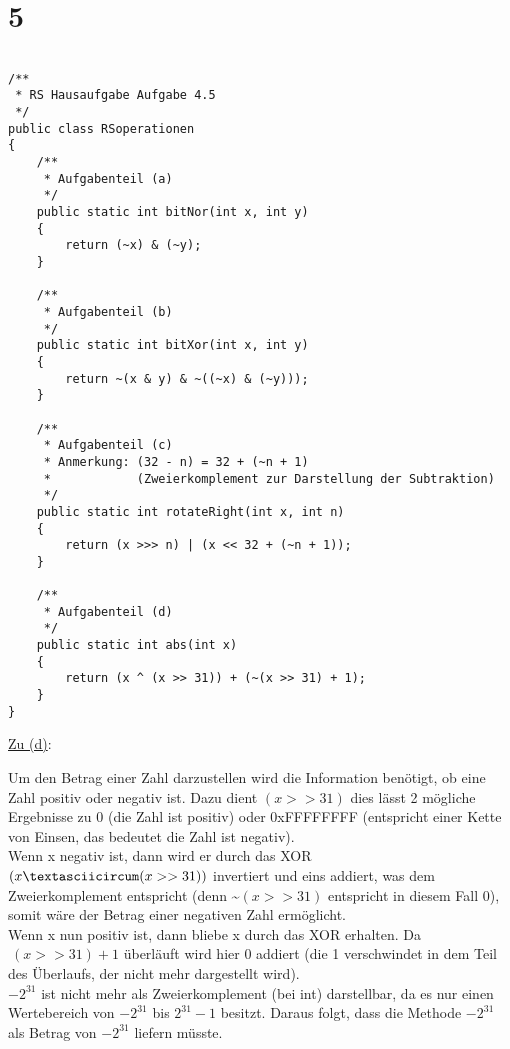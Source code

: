 \documentclass[a4paper]{scrartcl}
\begin{document}
\section{5}
\begin{lstlisting}

/**
 * RS Hausaufgabe Aufgabe 4.5
 */
public class RSoperationen
{
    /**
     * Aufgabenteil (a)
     */
    public static int bitNor(int x, int y)
    {
        return (~x) & (~y);
    }
    
    /**
     * Aufgabenteil (b)
     */
    public static int bitXor(int x, int y)
    {
        return ~(x & y) & ~((~x) & (~y)));
    }
    
    /**
     * Aufgabenteil (c)
     * Anmerkung: (32 - n) = 32 + (~n + 1) 
     *            (Zweierkomplement zur Darstellung der Subtraktion)
     */
    public static int rotateRight(int x, int n)
    {
        return (x >>> n) | (x << 32 + (~n + 1));
    }
    
    /**
     * Aufgabenteil (d)
     */
    public static int abs(int x)
    {
        return (x ^ (x >> 31)) + (~(x >> 31) + 1); 
    }
}
\end{lstlisting}
	\newpage
	\begin{flushleft}
		\underline{Zu (d)}: \\
	\end{flushleft}
    Um den Betrag einer Zahl darzustellen wird die Information benötigt, ob eine Zahl positiv oder
    negativ ist. Dazu dient \((x >> 31)\) dies lässt 2 mögliche Ergebnisse zu 0 (die Zahl ist 
    positiv) oder 0xFFFFFFFF (entspricht einer Kette von Einsen, das bedeutet die Zahl ist negativ). 		\\
    Wenn x negativ ist, dann wird er durch das XOR \((x \textasciicircum (x >> 31))\) invertiert und 
    eins addiert, was dem Zweierkomplement entspricht (denn \textasciitilde \((x >> 31)\) entspricht 
    in diesem Fall 0), somit wäre der Betrag einer negativen Zahl ermöglicht. \\
    Wenn x nun positiv ist, dann bliebe x durch das XOR erhalten. Da \(~(x >> 31) + 1\) überläuft 
    wird hier 0 addiert (die 1 verschwindet in dem Teil des Überlaufs, der nicht mehr dargestellt 
    wird). \\
	\(-2^{31}\) ist nicht mehr als Zweierkomplement (bei int) darstellbar, da es nur einen 
	Wertebereich von \(-2^{31}\) bis \(2^{31}-1\) besitzt. Daraus folgt, dass die Methode \(-2^{31}\) 
	als Betrag von \(-2^{31}\) liefern müsste.
\end{document}
